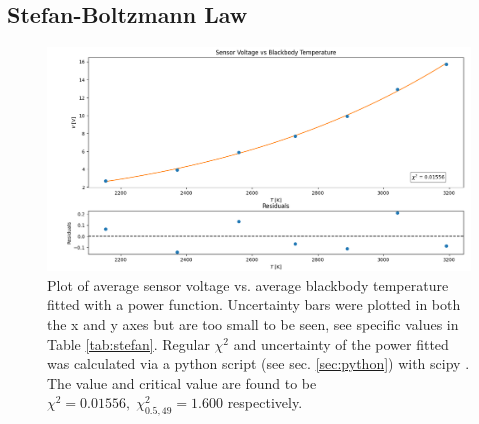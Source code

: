 \documentclass[12pt]{article}
\begin{document}
\subsection{Stefan-Boltzmann Law} \label{sec:stefan}
\begin{figure}[htbp]
\centering
\includegraphics[width=1\columnwidth]{figure/stefan.png}
\caption{Plot of average sensor voltage vs. average blackbody temperature fitted with a power function.  Uncertainty bars were plotted in both the x and y axes but are too small to be seen, see specific values in Table \ref{tab:stefan}. Regular $\chi^2$ and uncertainty of the power fitted was calculated via a python script (see sec. \ref{sec:python}) with scipy \autocite{2020SciPy-NMeth}. The value and critical value are found to be $\chi^2=0.01556,\;\chi^2_{0.5,49}=1.600$ respectively.}
\label{fig:stefan}
\end{figure}
\end{document}
